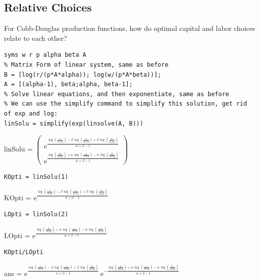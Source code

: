 \documentclass[
]{book}
\begin{document}
\hypertarget{relative-choices}{%
\subsection{Relative Choices}\label{relative-choices}}

For Cobb-Douglas production functions, how do optimal capital and labor
choices relate to each other?

\begin{verbatim}
syms w r p alpha beta A 
% Matrix Form of linear system, same as before
B = [log(r/(p*A*alpha)); log(w/(p*A*beta))];
A = [(alpha-1), beta;alpha, beta-1];
% Solve linear equations, and then exponentiate, same as before
% We can use the simplify command to simplify this solution, get rid of exp and log:
linSolu = simplify(exp(linsolve(A, B)))
\end{verbatim}

linSolu = \(\displaystyle \left(\begin{array}{c} {\mathrm{e}}^{\frac{\log \left(\frac{r}{A\,\alpha \,p}\right)-\beta \,\log \left(\frac{r}{A\,\alpha \,p}\right)+\beta \,\log \left(\frac{w}{A\,\beta \,p}\right)}{\alpha +\beta -1}} \\ {\mathrm{e}}^{\frac{\log \left(\frac{w}{A\,\beta \,p}\right)+\alpha \,\log \left(\frac{r}{A\,\alpha \,p}\right)-\alpha \,\log \left(\frac{w}{A\,\beta \,p}\right)}{\alpha +\beta -1}} \end{array}\right)\)

\begin{verbatim}
KOpti = linSolu(1)
\end{verbatim}

KOpti =
\(\displaystyle {\mathrm{e}}^{\frac{\log \left(\frac{r}{A\,\alpha \,p}\right)-\beta \,\log \left(\frac{r}{A\,\alpha \,p}\right)+\beta \,\log \left(\frac{w}{A\,\beta \,p}\right)}{\alpha +\beta -1}}\)

\begin{verbatim}
LOpti = linSolu(2)
\end{verbatim}

LOpti =
\(\displaystyle {\mathrm{e}}^{\frac{\log \left(\frac{w}{A\,\beta \,p}\right)+\alpha \,\log \left(\frac{r}{A\,\alpha \,p}\right)-\alpha \,\log \left(\frac{w}{A\,\beta \,p}\right)}{\alpha +\beta -1}}\)

\begin{verbatim}
KOpti/LOpti
\end{verbatim}

ans =
\(\displaystyle {\mathrm{e}}^{\frac{\log \left(\frac{r}{A\,\alpha \,p}\right)-\beta \,\log \left(\frac{r}{A\,\alpha \,p}\right)+\beta \,\log \left(\frac{w}{A\,\beta \,p}\right)}{\alpha +\beta -1}} \,{\mathrm{e}}^{-\frac{\log \left(\frac{w}{A\,\beta \,p}\right)+\alpha \,\log \left(\frac{r}{A\,\alpha \,p}\right)-\alpha \,\log \left(\frac{w}{A\,\beta \,p}\right)}{\alpha +\beta -1}}\)
\end{document}
